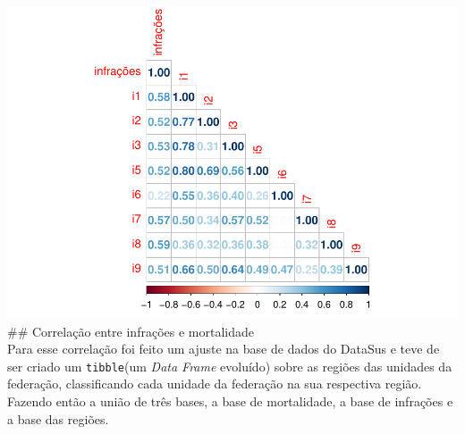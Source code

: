 \documentclass[
]{book}
\begin{document}
\includegraphics{RelatorioVelocidades_files/figure-latex/unnamed-chunk-26-1.pdf}
\#\# Correlação entre infrações e mortalidade\\
Para esse correlação foi feito um ajuste na base de dados do DataSus e teve de ser criado um \texttt{tibble}(um \emph{Data Frame} evoluído) sobre as regiões das unidades da federação, classificando cada unidade da federação na sua respectiva região. Fazendo então a união de três bases, a base de mortalidade, a base de infrações e a base das regiões.
\end{document}
